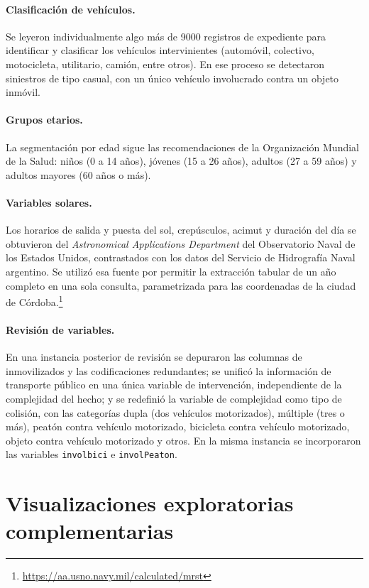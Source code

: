 \paragraph{Clasificación de vehículos.} Se leyeron individualmente algo más de 9000
registros de expediente para identificar y clasificar los vehículos intervinientes
(automóvil, colectivo, motocicleta, utilitario, camión, entre otros). En ese proceso se
detectaron siniestros de tipo casual, con un único vehículo involucrado contra un objeto
inmóvil.

\paragraph{Grupos etarios.} La segmentación por edad sigue las recomendaciones de la
Organización Mundial de la Salud: niños (0 a 14 años), jóvenes (15 a 26 años), adultos
(27 a 59 años) y adultos mayores (60 años o más).

\paragraph{Variables solares.} Los horarios de salida y puesta del sol, crepúsculos,
acimut y duración del día se obtuvieron del \textit{Astronomical Applications Department}
del Observatorio Naval de los Estados Unidos, contrastados con los datos del Servicio de
Hidrografía Naval argentino. Se utilizó esa fuente por permitir la extracción tabular de
un año completo en una sola consulta, parametrizada para las coordenadas de la ciudad de
Córdoba.\footnote{\url{https://aa.usno.navy.mil/calculated/mrst}}

\paragraph{Revisión de variables.} En una instancia posterior de revisión se depuraron
las columnas de inmovilizados y las codificaciones redundantes; se unificó la
información de transporte público en una única variable de intervención, independiente
de la complejidad del hecho; y se redefinió la variable de complejidad como tipo de
colisión, con las categorías dupla (dos vehículos motorizados), múltiple (tres o más),
peatón contra vehículo motorizado, bicicleta contra vehículo motorizado, objeto contra
vehículo motorizado y otros. En la misma instancia se incorporaron las variables
\texttt{involbici} e \texttt{involPeaton}.

\section{Visualizaciones exploratorias complementarias}
\label{sec:visualizaciones-exploratorias}

